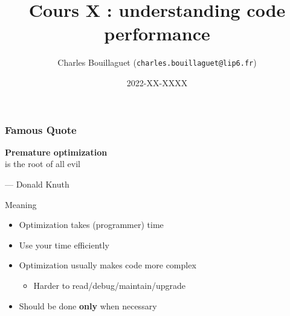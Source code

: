 \documentclass[xcolor={x11names,svgnames}]{beamer}
\author[C.~Bouillaguet]{Charles Bouillaguet \newline
  {\small (\texttt{charles.bouillaguet@lip6.fr})}}
\title{Cours X : understanding code performance}
\date{2022-XX-XXXX}
\begin{document}
\begin{frame}[label=title]
  \titlepage
\end{frame}


\begin{frame}
  \frametitle{Famous Quote}

  {\Huge \textbf{Premature optimization} \\ is the root of all evil

  \bigskip
  
  --- Donald Knuth }

\bigskip

  \begin{block}{Meaning}
    \begin{itemize}
    \item Optimization takes (programmer) time
    \item Use your time efficiently
    \item Optimization usually makes code more complex
      \begin{itemize}
      \item Harder to read/debug/maintain/upgrade
      \end{itemize}
    \item Should be done \textbf{only} when necessary
    \end{itemize}
  \end{block}
\end{frame}

\end{document}
